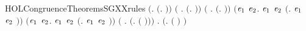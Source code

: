 \begin{SaveVerbatim}{HOLCongruenceTheoremsSGXXrules}
\HOLTokenTurnstile{} \ensuremath{(}\HOLSymConst{\HOLTokenForall{}}.  \ensuremath{(}\HOLTokenLambda{}. \ensuremath{)}\ensuremath{)} \HOLSymConst{\HOLTokenConj{}} \ensuremath{(}\HOLSymConst{\HOLTokenForall{}} .   \HOLSymConst{\HOLTokenImp{}}  \ensuremath{(}\HOLTokenLambda{}.  \HOLSymConst{\ensuremath{\ldotp}} \ensuremath{)}\ensuremath{)} \HOLSymConst{\HOLTokenConj{}}
   \ensuremath{(}\HOLSymConst{\HOLTokenForall{}} .   \HOLSymConst{\HOLTokenImp{}}  \ensuremath{(}\HOLTokenLambda{}. \HOLSymConst{\ensuremath{\ldotp}} \ensuremath{)}\ensuremath{)} \HOLSymConst{\HOLTokenConj{}}
   \ensuremath{(}\HOLSymConst{\HOLTokenForall{}}\ensuremath{\HOLBoundVar{e}\sb{\mathrm{1}}} \ensuremath{\HOLBoundVar{e}\sb{\mathrm{2}}}.  \ensuremath{\HOLBoundVar{e}\sb{\mathrm{1}}} \HOLSymConst{\HOLTokenConj{}}  \ensuremath{\HOLBoundVar{e}\sb{\mathrm{2}}} \HOLSymConst{\HOLTokenImp{}}  \ensuremath{(}\HOLTokenLambda{}. \ensuremath{\HOLBoundVar{e}\sb{\mathrm{1}}}  \HOLSymConst{\ensuremath{+}} \ensuremath{\HOLBoundVar{e}\sb{\mathrm{2}}} \ensuremath{)}\ensuremath{)} \HOLSymConst{\HOLTokenConj{}}
   \ensuremath{(}\HOLSymConst{\HOLTokenForall{}}\ensuremath{\HOLBoundVar{e}\sb{\mathrm{1}}} \ensuremath{\HOLBoundVar{e}\sb{\mathrm{2}}}.  \ensuremath{\HOLBoundVar{e}\sb{\mathrm{1}}} \HOLSymConst{\HOLTokenConj{}}  \ensuremath{\HOLBoundVar{e}\sb{\mathrm{2}}} \HOLSymConst{\HOLTokenImp{}}  \ensuremath{(}\HOLTokenLambda{}. \ensuremath{\HOLBoundVar{e}\sb{\mathrm{1}}}  \HOLSymConst{\ensuremath{\mid}} \ensuremath{\HOLBoundVar{e}\sb{\mathrm{2}}} \ensuremath{)}\ensuremath{)} \HOLSymConst{\HOLTokenConj{}}
   \ensuremath{(}\HOLSymConst{\HOLTokenForall{}} .   \HOLSymConst{\HOLTokenImp{}}  \ensuremath{(}\HOLTokenLambda{}.   \ensuremath{(} \ensuremath{)}\ensuremath{)}\ensuremath{)} \HOLSymConst{\HOLTokenConj{}}
   \HOLSymConst{\HOLTokenForall{}} .   \HOLSymConst{\HOLTokenImp{}}  \ensuremath{(}\HOLTokenLambda{}.  \ensuremath{(} \ensuremath{)} \ensuremath{)}
\end{SaveVerbatim}
